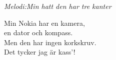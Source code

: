 {\footnotesize\textit{Melodi:Min hatt den har tre kanter}}\par
Min Nokia har en kamera,\\
en dator och kompass.\\
Men den har ingen korkskruv.\\
Det tycker jag är kass'!
\vspace{10pt}

